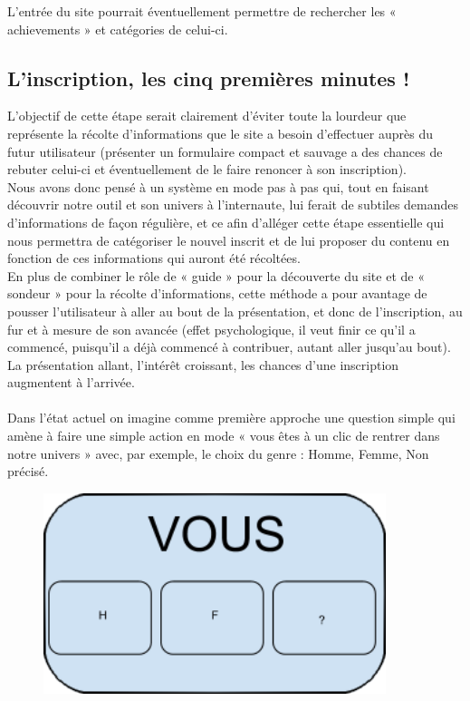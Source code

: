\documentclass{life-fr}
\begin{document}
L'entrée du site pourrait éventuellement permettre de rechercher les « achievements » et catégories de celui-ci.

\newpage

\subsection{L'inscription, les cinq premières minutes !}

L'objectif de cette étape serait clairement d'éviter toute la lourdeur que représente la récolte d'informations que le site a besoin d'effectuer auprès du futur utilisateur (présenter un formulaire compact et sauvage a des chances de rebuter celui-ci et éventuellement de le faire renoncer à son inscription).\\

Nous avons donc pensé à un système en mode pas à pas qui, tout en faisant découvrir notre outil et son univers à l'internaute, lui ferait de subtiles demandes d'informations de façon régulière, et ce afin d'alléger cette étape essentielle qui nous permettra de catégoriser le nouvel inscrit et de lui proposer du contenu en fonction de ces informations qui auront été récoltées.\\

En plus de combiner le rôle de « guide » pour la découverte du site et de « sondeur » pour la récolte d'informations, cette méthode a pour avantage de pousser l'utilisateur à aller au bout de la présentation, et donc de l'inscription, au fur et à mesure de son avancée (effet psychologique, il veut finir ce qu'il a commencé, puisqu'il a déjà commencé à contribuer, autant aller jusqu'au bout). La présentation allant, l'intérêt croissant, les chances d'une inscription augmentent à l'arrivée.\\
\\

Dans l'état actuel on imagine comme première approche une question simple qui amène à faire une simple action en mode « vous êtes à un clic de rentrer dans notre univers » avec, par exemple, le choix du genre : Homme, Femme, Non précisé.

\begin{figure}[H]
  \begin{center}
    \includegraphics[width=10cm]{img/vous.png}
  \end{center}
\end{figure}
\end{document}
